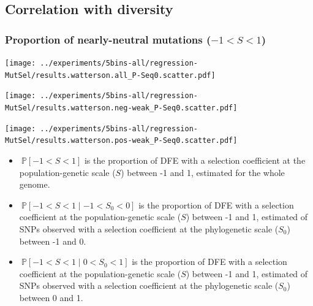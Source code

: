 \documentclass{article}
\newcommand{\proba}{\mathbb{P}}
\newcommand{\Sphy}{S_{0}}
\newcommand{\divWeakDel}{-1 < \Sphy < 0}
\newcommand{\divWeakAdv}{0 < \Sphy < 1}
\newcommand{\given}{\mid}
\newcommand{\Spop}{S}
\newcommand{\polyNeutral}{-1 < \Spop < 1}
\begin{document}
    \subsection{Correlation with diversity}

    \subsubsection{Proportion of nearly-neutral mutations ($\polyNeutral$)}\label{subsec:proportion-nearly-neutral-mutations}
    \begin{minipage}{0.32\linewidth}
        \texttt{[image: ../experiments/5bins-all/regression-MutSel/results.watterson.all\_P-Seq0.scatter.pdf]}
    \end{minipage}
    \begin{minipage}{0.32\linewidth}
        \texttt{[image: ../experiments/5bins-all/regression-MutSel/results.watterson.neg-weak\_P-Seq0.scatter.pdf]}
    \end{minipage}
    \begin{minipage}{0.32\linewidth}
        \texttt{[image: ../experiments/5bins-all/regression-MutSel/results.watterson.pos-weak\_P-Seq0.scatter.pdf]}
    \end{minipage}
    \begin{itemize}
        \item $\ \proba [ \polyNeutral ]$ is the proportion of DFE with a selection coefficient at the population-genetic scale ($\Spop$) between -1 and 1, estimated for the whole genome.
        \item $\ \proba [ \polyNeutral \given \divWeakDel]$ is the proportion of DFE with a selection coefficient at the population-genetic scale ($\Spop$) between -1 and 1, estimated of SNPs observed with a selection coefficient at the phylogenetic scale ($\Sphy$) between -1 and 0.
        \item $\ \proba [ \polyNeutral \given \divWeakAdv ]$ is the proportion of DFE with a selection coefficient at the population-genetic scale ($\Spop$) between -1 and 1, estimated of SNPs observed with a selection coefficient at the phylogenetic scale ($\Sphy$) between 0 and 1.
    \end{itemize}
\end{document}
